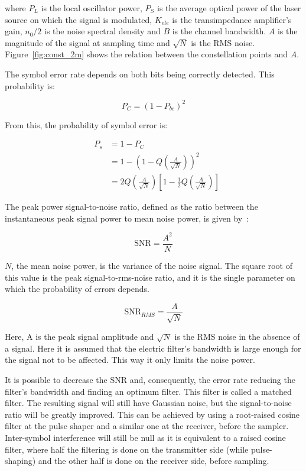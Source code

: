 \begin{refsection}
\noindent where $P_L$ is the local oscillator power, $P_S$ is the average optical power of the laser source on which the signal is modulated, $K_{ele}$ is the transimpedance amplifier's gain, $n_0/2$ is the noise spectral density and $B$ is the channel bandwidth. $A$ is the magnitude of the signal at sampling time and $\sqrt{N}$ is the RMS noise. Figure~\ref{fig:const_2m} shows the relation between the constellation points and $A$.

The symbol error rate depends on both bits being correctly detected. This probability is:

\begin{equation}
P_C = (1 - P_{be})^2
\end{equation}

From this, the probability of symbol error is:

\begin{eqnarray}
&P_s &= 1-P_C \nonumber\\
&	   &= 1 - \left(1 - Q \left({\frac{A}{\sqrt{N}}}\right)\right)^2 \nonumber \\
&	   &= 2 Q\left({\frac{A}{\sqrt{N}}}\right)\left[1-\frac{1}{2} Q \left({\frac{A}{\sqrt{N}}}\right)\right]
\end{eqnarray}


The peak power signal-to-noise ratio, defined as the ratio between the instantaneous peak signal power to mean noise power, is given by~\cite{mischasch}:

\begin{equation}
	\text{SNR} = \frac{A^2}{{N}}
\end{equation}

\noindent 	$N$, the mean noise power, is the variance of the noise signal. The square root of this value is the peak signal-to-rms-noise ratio, and it is the single parameter on which the probability of errors depends.

\begin{equation}
\text{SNR}_{RMS} = \frac{A}{\sqrt{N}}
\end{equation}

Here, A is the peak signal amplitude and $\sqrt{N}$ is the RMS noise in the absence of a signal. Here it is assumed that the electric filter's bandwidth is large enough for the signal not to be affected. This way it only limits the noise power.

It is possible to decrease the SNR and, consequently, the error rate reducing the filter's bandwidth and finding an optimum filter. This filter is called a matched filter. The resulting signal will still have Gaussian noise, but the signal-to-noise ratio will be greatly improved. This can be achieved by using a root-raised cosine filter at the pulse shaper and a similar one at the receiver, before the sampler. Inter-symbol interference will still be null as it is equivalent to a raised cosine filter, where half the filtering is done on the transmitter side (while pulse-shaping) and the other half is done on the receiver side, before sampling.


\end{refsection}
